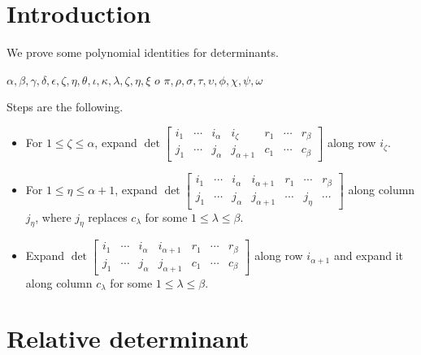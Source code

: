 \documentclass{amsart}
\begin{document}
\section{Introduction}
{
    We prove some polynomial identities for determinants. 

    $\alpha,\beta,\gamma,\delta,\epsilon,\zeta,\eta,\theta,\iota,\kappa,\lambda,\zeta,\eta,\xi$ $o$ $\pi,\rho,\sigma,\tau,\upsilon,\phi,\chi,\psi,\omega$

    Steps are the following. 
    \begin{itemize}
        \item For $1\leq \zeta\leq \alpha$, expand $\det\begin{bmatrix}
            i_1&\cdots&i_\alpha&i_\zeta&r_1&\cdots&r_\beta\\
            j_1&\cdots&j_\alpha&j_{\alpha+1}&c_1&\cdots&c_\beta
        \end{bmatrix}$ along row $i_\zeta$. 

        \item For $1\leq\eta\leq\alpha+1$, expand $\det\begin{bmatrix}
            i_1&\cdots&i_\alpha&i_{\alpha+1}&r_1&\cdots&r_\beta\\
            j_1&\cdots&j_\alpha&j_{\alpha+1}&\cdots&j_\eta&\cdots
        \end{bmatrix}$ along column $j_\eta$, where $j_\eta$ replaces $c_\lambda$ for some $1\leq\lambda\leq\beta$. 

        \item Expand $\det\begin{bmatrix}
            i_1&\cdots&i_\alpha&i_{\alpha+1}&r_1&\cdots&r_\beta\\
            j_1&\cdots&j_\alpha&j_{\alpha+1}&c_1&\cdots&c_\beta
        \end{bmatrix}$ along row $i_{\alpha+1}$ and expand it along column $c_\lambda$ for some $1\leq \lambda\leq \beta$. 
    \end{itemize}
}

\section{Relative determinant}
{
}
\end{document}
